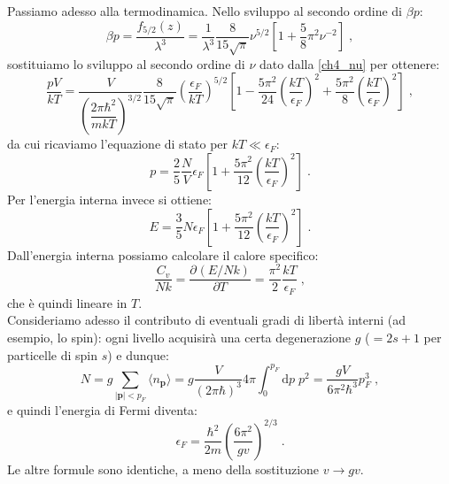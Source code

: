 \documentclass[10pt,a4paper]{report}
\theoremstyle{definition}
\newcommand{\pdev}[3][]{\frac{\partial^{#1} #2}{\partial #3^{#1}}}
\numberwithin{equation}{section}
\newcommand{\diff}[1][]{\mathrm{d}#1}
\newcommand{\bra}{\langle}
\newcommand{\ket}{\rangle}
\begin{document}
Passiamo adesso alla termodinamica. Nello sviluppo al secondo ordine di $\beta p$:
$$
\beta p=\frac{f_{5/2}(z)}{\lambda^3}=\frac{1}{\lambda^3}\frac{8}{15\sqrt{\pi}}\nu^{5/2}\left[1+\frac{5}{8}\pi^2\nu^{-2}\right]\;,
$$
sostituiamo lo sviluppo al secondo ordine di $\nu$ dato dalla \eqref{ch4_nu} per ottenere:
$$
\frac{pV}{kT}=\frac{V}{\left(\dfrac{2\pi\hbar^2}{mkT}\right)^{3/2}}\frac{8}{15\sqrt{\pi}}\left(\frac{\epsilon_F}{kT}\right)^{5/2}\left[1-\frac{5\pi^2}{24}\left(\frac{kT}{\epsilon_F}\right)^2+\frac{5\pi^2}{8}\left(\frac{kT}{\epsilon_F}\right)^2\right]\;,
$$
da cui ricaviamo l'equazione di stato per $kT\ll \epsilon_F$:
\begin{equation}
p=\frac{2}{5}\frac{N}{V}\epsilon_F\left[1+\frac{5\pi^2}{12}\left(\frac{kT}{\epsilon_F}\right)^2\right]\;.
\end{equation}
Per l'energia interna invece si ottiene:
\begin{equation}
E=\frac{3}{5}N\epsilon_F\left[1+\frac{5\pi^2}{12}\left(\frac{kT}{\epsilon_F}\right)^2\right]\;.
\end{equation}
Dall'energia interna possiamo calcolare il calore specifico:
\begin{equation}
\frac{C_v}{Nk}=\pdev{(E/Nk)}{T}=\frac{\pi^2}{2}\frac{kT}{\epsilon_F}\;,
\end{equation}
che è quindi lineare in $T$. \\
Consideriamo adesso il contributo di eventuali gradi di libertà interni (ad esempio, lo spin): ogni livello acquisirà una certa degenerazione $g$ ($=2s+1$ per particelle di spin $s$) e dunque:
$$
N=g\sum_{|\mathbf{p}|<p_F}\bra n_{\mathbf{p}}\ket=g\frac{V}{(2\pi\hbar)^3}4\pi\int_0^{p_F}\diff{p}\;p^2=\frac{gV}{6\pi^2\hbar^3}p_F^3\;,
$$
e quindi l'energia di Fermi diventa:
\begin{equation}
\epsilon_F=\frac{\hbar^2}{2m}\left(\frac{6\pi^2}{gv}\right)^{2/3}\;.
\end{equation}
Le altre formule sono identiche, a meno della sostituzione $v\to gv$.
\end{document}
